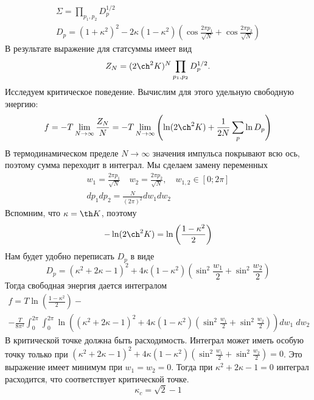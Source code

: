 \documentclass[a4paper,12pt]{article}
\theoremstyle{definition}
\theoremstyle{definition}
\theoremstyle{definition}
\begin{document}
\begin{eqnarray}
  \label{eq:132}
  \Sigma=\prod_{p_1,p_2} D^{1/2}_{p}\\
  D_p=(1+\kappa^2)^2 -2\kappa (1-\kappa^2)\left( \cos \frac{2\pi p_1}{\sqrt N} +\cos \frac{2\pi p_2}{\sqrt N}\right)
\end{eqnarray}
В результате выражение для статсуммы имеет вид
\begin{equation}
  \label{eq:133}
  Z_N=(2\ch^2 K)^N \prod_{p_1,p_2}D_p^{1/2}.
\end{equation}
Исследуем критическое поведение. Вычислим для этого удельную свободную энергию:
\begin{equation}
  \label{eq:134}
  f=-T \lim_{N\to \infty}\frac{Z_N}{N}=-T \lim_{N\to \infty} \left(\ln (2\ch^2 K)+\frac{1}{2N}\sum_p \ln D_p\right)
\end{equation}
В термодинамическом пределе $N\to \infty$ значения импульса покрывают всю ось, поэтому сумма переходит в интеграл. Мы сделаем замену переменных
\begin{eqnarray}
  \label{eq:135}
  w_1=\frac{2\pi p_1}{\sqrt N}\quad  w_2=\frac{2\pi p_2}{\sqrt N},\quad w_{1,2}\in [0;2\pi]\\
  dp_1 dp_2=\frac{N}{(2\pi)^2} dw_1 dw_2
\end{eqnarray}
Вспомним, что $\kappa=\th K$, поэтому
\begin{equation}
  \label{eq:136}
  -\ln(2\ch^2 K)=\ln\left(\frac{1-\kappa^2}{2}\right)
\end{equation}
Нам будет удобно переписать $D_p$  в виде
\begin{equation}
  \label{eq:137}
  D_p=(\kappa^2+2\kappa -1)^2 +4\kappa (1-\kappa^2) \left(\sin^2 \frac{w_1}{2} +\sin^2 \frac{w_2}{2}\right)
\end{equation}
Тогда свободная энергия дается интегралом
\begin{multline}
  \label{eq:138}
  f=T\ln\left(\frac{1-\kappa^2}{2}\right)-\\
  -\frac{T}{8\pi^2}\int_0^{2\pi}\int_0^{2\pi}\ln\left((\kappa^2 +2\kappa-1)^2 +4\kappa (1-\kappa^2)\left(\sin^2 \frac{w_1}{2}+\sin^2\frac{w_2}{2}\right)\right) dw_1 \;dw_2
\end{multline}
В критической точке должна быть расходимость. Интеграл может иметь особую точку только при $(\kappa^2 +2\kappa-1)^2 +4\kappa (1-\kappa^2)\left(\sin^2 \frac{w_1}{2}+\sin^2\frac{w_2}{2}\right)=0$. Это выражение имеет минимум при $w_1=w_2=0$. Тогда при $\kappa^2+2\kappa-1=0$ интеграл расходится, что соответствует критической точке.
\begin{equation}
  \label{eq:139}
  \kappa_c=\sqrt 2 -1
\end{equation}
\end{document}
